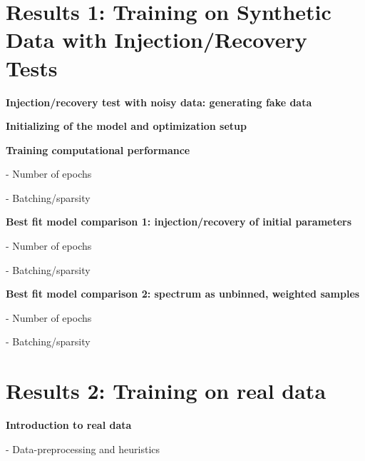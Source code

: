 \documentclass[twocolumn]{aastex631}
\begin{document}
\section{Results 1: Training on Synthetic Data with Injection/Recovery Tests} \label{results1Synthetic}

\begin{mdframed}
  \textbf{Injection/recovery test with noisy data: generating fake data} \par
  \textcolor{lightgray}{\lipsum[9]}
\end{mdframed}

\begin{mdframed}
  \textbf{Initializing of the model and optimization setup} \par
  \textcolor{lightgray}{\lipsum[10]}
\end{mdframed}


\begin{mdframed}
  \textbf{Training computational performance} \par
  - Number of epochs\par
  - Batching/sparsity\par
  \textcolor{lightgray}{\lipsum[9]}
\end{mdframed}

\begin{mdframed}
  \textbf{Best fit model comparison 1: injection/recovery of initial parameters} \par
  - Number of epochs\par
  - Batching/sparsity\par
  \textcolor{lightgray}{\lipsum[10]}
\end{mdframed}

\begin{mdframed}
  \textbf{Best fit model comparison 2: spectrum as unbinned, weighted samples} \par
  - Number of epochs\par
  - Batching/sparsity\par
  \textcolor{lightgray}{\lipsum[11]}
\end{mdframed}


\section{Results 2: Training on real data}
\begin{mdframed}
  \textbf{Introduction to real data} \par
  - Data-preprocessing and heuristics \par
  \textcolor{lightgray}{\lipsum[12]}
\end{mdframed}
\end{document}
